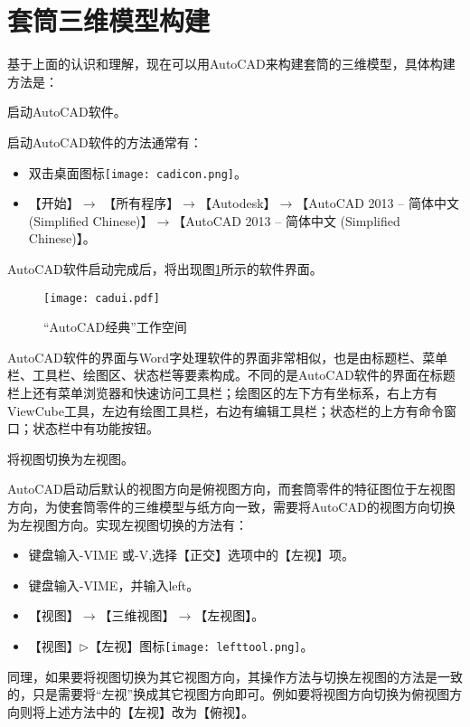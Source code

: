 \section{套筒三维模型构建}\label{sec:taotongjianmo}
基于上面的认识和理解，现在可以用AutoCAD来构建套筒的三维模型，具体构建方法是：
\begin{procedure}

\item 启动AutoCAD软件。

启动AutoCAD软件的方法通常有：
\begin{itemize}
\item 双击桌面图标\texttt{[image: cadicon.png]}。
\item 【开始】$\rightarrow$ 【所有程序】$\rightarrow$【Autodesk】$\rightarrow$【AutoCAD 2013 – 简体中文 (Simplified Chinese)】$\rightarrow$【AutoCAD 2013 – 简体中文 (Simplified Chinese)】。
\end{itemize}
AutoCAD软件启动完成后，将出现图\ref{fig:cadui}所示的软件界面。
\begin{figure}[htbp]
\centering
\texttt{[image: cadui.pdf]}
\caption{“AutoCAD经典”工作空间}\label{fig:cadui}
\end{figure}
AutoCAD软件的界面与Word字处理软件的界面非常相似，也是由标题栏、菜单栏、工具栏、绘图区、状态栏等要素构成。不同的是AutoCAD软件的界面在标题栏上还有菜单浏览器和快速访问工具栏；绘图区的左下方有坐标系，右上方有ViewCube工具，左边有绘图工具栏，右边有编辑工具栏；状态栏的上方有命令窗口；状态栏中有功能按钮。

\item 将视图切换为左视图。

AutoCAD启动后默认的视图方向是俯视图方向，而套筒零件的特征图位于左视图方向，为使套筒零件的三维模型与纸方向一致，需要将AutoCAD的视图方向切换为左视图方向。实现左视图切换的方法有：
\begin{itemize}
\item 键盘输入-VIME 或-V,选择【正交】选项中的【左视】项。
\item 键盘输入-VIME，并输入left。
\item 【视图】$\rightarrow$【三维视图】$\rightarrow$【左视图】。
\item 【视图】$\triangleright$【左视】图标\texttt{[image: lefttool.png]}。
\end{itemize}
同理，如果要将视图切换为其它视图方向，其操作方法与切换左视图的方法是一致的，只是需要将“左视”换成其它视图方向即可。例如要将视图方向切换为俯视图方向则将上述方法中的【左视】改为【俯视】。


\end{procedure}
